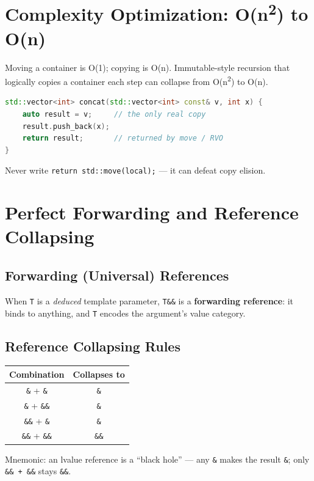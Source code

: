 \section{Complexity Optimization: O(n\textsuperscript{2}) to O(n)}

Moving a container is O(1); copying is O(n). Immutable-style recursion that logically copies a container each step can collapse from O(n\textsuperscript{2}) to O(n).

\begin{lstlisting}[language=C++, caption={immutable-style recursion made linear by moves}]
std::vector<int> concat(std::vector<int> const& v, int x) {
    auto result = v;     // the only real copy
    result.push_back(x);
    return result;       // returned by move / RVO
}
\end{lstlisting}

Never write \texttt{return std::move(local);} --- it can defeat copy elision.

\section{Perfect Forwarding and Reference Collapsing}

\subsection{Forwarding (Universal) References}
When \texttt{T} is a \emph{deduced} template parameter, \texttt{T\&\&} is a \textbf{forwarding reference}: it binds to anything, and \texttt{T} encodes the argument's value category.

\subsection{Reference Collapsing Rules}
\begin{center}
\begin{tabular}{|c|c|}
\hline \textbf{Combination} & \textbf{Collapses to} \\ \hline
\texttt{\&} + \texttt{\&}   & \texttt{\&} \\
\texttt{\&} + \texttt{\&\&} & \texttt{\&} \\
\texttt{\&\&} + \texttt{\&} & \texttt{\&} \\
\texttt{\&\&} + \texttt{\&\&} & \texttt{\&\&} \\ \hline
\end{tabular}
\end{center}
Mnemonic: an lvalue reference is a ``black hole'' --- any \texttt{\&} makes the result \texttt{\&}; only \texttt{\&\& + \&\&} stays \texttt{\&\&}.

